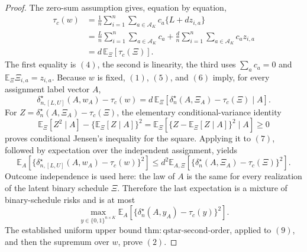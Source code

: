 \documentclass{article}
\begin{document}
{\begin{proof}
The zero-sum assumption gives, equation by equation,
\[
\begin{aligned}
\tau_c(w)
&=\frac1n\sum_{i=1}^n\sum_{a\in\mathcal A_K}
 c_a\{L+d z_{i,a}\}\\
&=\frac Ln\sum_{i=1}^n\sum_{a\in\mathcal A_K}c_a
 +\frac d n\sum_{i=1}^n\sum_{a\in\mathcal A_K}c_a z_{i,a}\\
&=d\,\mathbb E_{\Xi}\!\left[\tau_c(\Xi)\right].
\end{aligned}
\tag{6}
\]
The first equality is \((4)\), the second is linearity, the third uses \(\sum_a c_a=0\) and \(\mathbb E_\Xi\Xi_{i,a}=z_{i,a}\). Because \(w\) is fixed, \((1)\), \((5)\), and \((6)\) imply, for every assignment label vector \(A\),
\[
\delta_{n,[L,U]}^\star(A,w_A)-\tau_c(w)
=d\,\mathbb E_{\Xi}\!\left[
 \delta_n^\star(A,\Xi_A)-\tau_c(\Xi)\mid A
\right].
\tag{7}
\]
For
\(Z=\delta_n^\star(A,\Xi_A)-\tau_c(\Xi)\), the elementary conditional-variance identity
\[
\mathbb E_\Xi[Z^2\mid A]-\{\mathbb E_\Xi[Z\mid A]\}^2
=\mathbb E_\Xi\!\left[
 \{Z-\mathbb E_\Xi[Z\mid A]\}^2\mid A
\right]\ge0
\]
proves conditional Jensen's inequality for the square. Applying it to \((7)\), followed by expectation over the independent assignment, yields
\[
\mathbb E_A\!\left[
 \{\delta_{n,[L,U]}^\star(A,w_A)-\tau_c(w)\}^2
\right]
\le d^2\mathbb E_{A,\Xi}\!\left[
 \{\delta_n^\star(A,\Xi_A)-\tau_c(\Xi)\}^2
\right].
\tag{8}
\]
Outcome independence is used here: the law of \(A\) is the same for every realization of the latent binary schedule \(\Xi\). Therefore the last expectation is a mixture of binary-schedule risks and is at most
\[
\max_{y\in\{0,1\}^{n\times K}}
\mathbb E_A\!\left[
 \{\delta_n^\star(A,y_A)-\tau_c(y)\}^2
\right].
\tag{9}
\]
The established uniform upper bound \(\mathrm{thm:qstar\text{-}second\text{-}order}\), applied to \((9)\), and then the supremum over \(w\), prove \((2)\).


\end{proof}}
\end{document}
